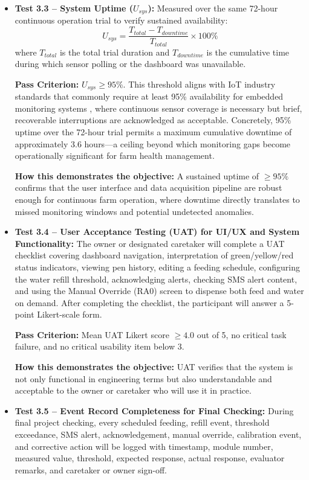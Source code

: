\begin{itemize}
  \item \textbf{Test 3.3 -- System Uptime ($U_{sys}$):} Measured over the same 72-hour continuous operation trial to verify sustained availability:
    \begin{equation}
      U_{sys} = \frac{T_{total} - T_{downtime}}{T_{total}} \times 100\%
    \end{equation}
    where $T_{total}$ is the total trial duration and $T_{downtime}$ is the cumulative time during which sensor polling or the dashboard was unavailable.

    \textbf{Pass Criterion:} $U_{sys} \geq 95\%$. This threshold aligns with IoT industry standards that commonly require at least 95\% availability for embedded monitoring systems \cite{tibreza2023swine,carvalho2023iot}, where continuous sensor coverage is necessary but brief, recoverable interruptions are acknowledged as acceptable. Concretely, 95\% uptime over the 72-hour trial permits a maximum cumulative downtime of approximately 3.6 hours---a ceiling beyond which monitoring gaps become operationally significant for farm health management.

    \textbf{How this demonstrates the objective:} A sustained uptime of $\geq 95\%$ confirms that the user interface and data acquisition pipeline are robust enough for continuous farm operation, where downtime directly translates to missed monitoring windows and potential undetected anomalies.

  \item \textbf{Test 3.4 -- User Acceptance Testing (UAT) for UI/UX and System Functionality:} The owner or designated caretaker will complete a UAT checklist covering dashboard navigation, interpretation of green/yellow/red status indicators, viewing pen history, editing a feeding schedule, configuring the water refill threshold, acknowledging alerts, checking SMS alert content, and using the Manual Override (RA0) screen to dispense both feed and water on demand. After completing the checklist, the participant will answer a 5-point Likert-scale form.

    \textbf{Pass Criterion:} Mean UAT Likert score $\geq 4.0$ out of 5, no critical task failure, and no critical usability item below 3.

    \textbf{How this demonstrates the objective:} UAT verifies that the system is not only functional in engineering terms but also understandable and acceptable to the owner or caretaker who will use it in practice.

  \item \textbf{Test 3.5 -- Event Record Completeness for Final Checking:} During final project checking, every scheduled feeding, refill event, threshold exceedance, SMS alert, acknowledgement, manual override, calibration event, and corrective action will be logged with timestamp, module number, measured value, threshold, expected response, actual response, evaluator remarks, and caretaker or owner sign-off.


\end{itemize}
